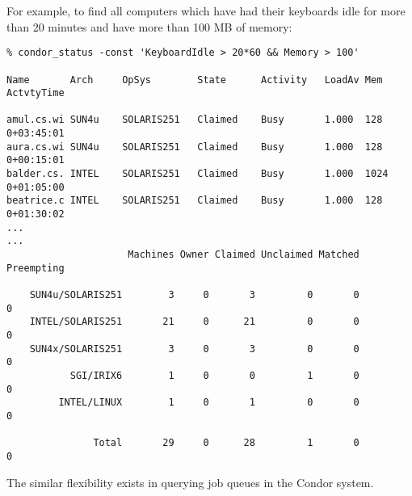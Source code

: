 For example, to find all computers which have had their keyboards idle for 
more than 20 minutes and have more than 100 MB of memory:
\footnotesize
\begin{verbatim}
% condor_status -const 'KeyboardIdle > 20*60 && Memory > 100'

Name       Arch     OpSys        State      Activity   LoadAv Mem  ActvtyTime

amul.cs.wi SUN4u    SOLARIS251   Claimed    Busy       1.000  128   0+03:45:01
aura.cs.wi SUN4u    SOLARIS251   Claimed    Busy       1.000  128   0+00:15:01
balder.cs. INTEL    SOLARIS251   Claimed    Busy       1.000  1024  0+01:05:00
beatrice.c INTEL    SOLARIS251   Claimed    Busy       1.000  128   0+01:30:02
...
...
                     Machines Owner Claimed Unclaimed Matched Preempting

    SUN4u/SOLARIS251        3     0       3         0       0          0
    INTEL/SOLARIS251       21     0      21         0       0          0
    SUN4x/SOLARIS251        3     0       3         0       0          0
           SGI/IRIX6        1     0       0         1       0          0
         INTEL/LINUX        1     0       1         0       0          0

               Total       29     0      28         1       0          0
\end{verbatim}
\normalsize

The similar flexibility exists in querying job queues in the Condor system.

